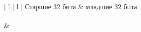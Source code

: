 \begin{center}
\begin{tabular}{ | l | l | }
\hline
	Старшие 32 бита & младшие 32 бита \\
\hline
{} \\
\hline
{} &  \\
\hline
\end{tabular}
\end{center}
